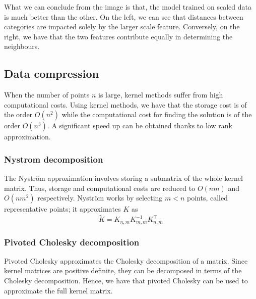 What we can conclude from the image is that, the model trained on scaled data is much better than the other.
On the left, we can see that distances between categories are impacted solely by the larger scale feature. Conversely, on the right, we have that the two features contribute equally in determining the neighbours.

\subsection{Data compression}
When the number of points $n$ is large, kernel methods suffer from high computational costs. 
Using kernel methods, we have that the storage cost is of the order $O(n^2)$ while the computational cost for finding the solution is of the order $O(n^3)$.
A significant speed up can be obtained thanks to low rank approximation.


\subsubsection{Nystrom decomposition}
The Nyström approximation involves storing a submatrix of the whole kernel matrix. Thus, storage and computational costs are reduced to $O(nm)$ and $O(nm^2)$ respectively.
Nyström works by selecting $m<n$ points, called representative points; it approximates $K$ as
\begin{equation}
    \tilde {K}=K_{n,m} K_{m,m}^{-1}K_{n,m}^\intercal
\end{equation}


\subsubsection{Pivoted Cholesky decomposition}
Pivoted Cholesky approximates the Cholesky decomposition of a matrix. Since kernel matrices are positive definite, they can be decomposed in terms of the Cholesky decomposition. Hence, we have that pivoted Cholesky can be used to approximate the full kernel matrix.


\newpage
